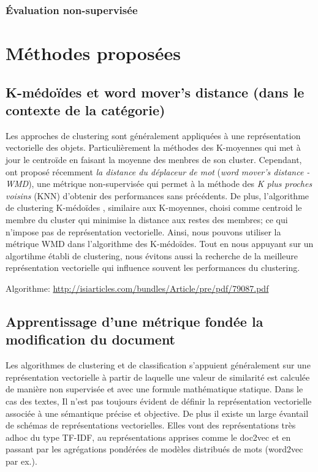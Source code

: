\subsubsection{Évaluation non-supervisée}

\section{Méthodes proposées}

\subsection{K-médoïdes et word mover's distance (dans le contexte de la catégorie)}

Les approches de clustering sont généralement appliquées à une représentation vectorielle des objets. Particulièrement la méthodes des K-moyennes qui met à jour le centroïde en faisant la moyenne des menbres de son cluster. Cependant, \cite{kusner2015wordmoverdist} ont proposé récemment \textit{la distance du déplaceur de mot} (\textit{word mover's distance - WMD}), une métrique non-supervisée qui permet à la méthode des \textit{K plus proches voisins} (KNN) d'obtenir des performances sans précédents. De plus, l'algorithme de clustering K-médoïdes \citep{kaufman1987kmedoids}, similaire aux K-moyennes, choisi comme centroid le membre du cluster qui minimise la distance aux restes des membres; ce qui n'impose pas de représentation vectorielle. Ainsi, nous pouvons utiliser la métrique WMD dans  l'algorithme des K-médoïdes. Tout en nous appuyant sur un algortihme établi de clustering, nous évitons aussi la recherche de la meilleure représentation vectorielle qui influence souvent les performances du clustering. 

Algorithme: \url{http://isiarticles.com/bundles/Article/pre/pdf/79087.pdf}


\subsection{Apprentissage d'une métrique fondée la modification du document}
Les algorithmes de clustering et de classification s'appuient généralement sur une représentation vectorielle à partir de laquelle une valeur de similarité est calculée de manière non supervisée et avec une formule mathématique statique. Dans le cas des textes, Il n'est pas toujours évident de définir la représentation vectorielle associée à une sémantique précise et objective. De plus il existe un large évantail de schémas de représentations vectorielles. Elles vont des représentations très adhoc du type TF-IDF, au représentations apprises comme le doc2vec et en passant par les agrégations pondérées de modèles distribués de mots (word2vec par ex.). 

